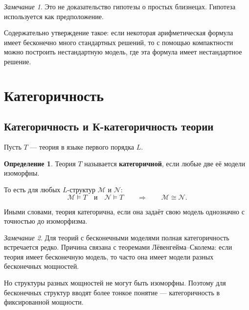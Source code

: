 \documentclass[12pt,a4paper,oneside,openany]{book}
\theoremstyle{definition}
\newtheorem{definition}{Определение}[chapter]
\theoremstyle{plain}
\theoremstyle{remark}
\newtheorem{remark}{Замечание}[chapter]
\begin{document}
\begin{remark}
Это не доказательство гипотезы о простых близнецах. Гипотеза используется как предположение.

Содержательно утверждение такое: если некоторая арифметическая формула имеет бесконечно много стандартных решений, то с помощью компактности можно построить нестандартную модель, где эта формула имеет нестандартное решение.
\end{remark}



















\section{Категоричность}

\subsection{Категоричность и К-категоричность теории}

Пусть $T$ — теория в языке первого порядка $L$.

\begin{definition}
Теория $T$ называется \textbf{категоричной}, если любые две её модели изоморфны.

То есть для любых $L$-структур $\mathcal M$ и $\mathcal N$:
\[
\mathcal M\models T
\quad
\text{и}
\quad
\mathcal N\models T
\qquad
\Longrightarrow
\qquad
\mathcal M\cong\mathcal N.
\]
\end{definition}

Иными словами, теория категорична, если она задаёт свою модель однозначно с точностью до изоморфизма.

\begin{remark}
Для теорий с бесконечными моделями полная категоричность встречается редко. Причина связана с теоремами Лёвенгейма--Сколема: если теория имеет бесконечную модель, то часто она имеет модели разных бесконечных мощностей.

Но структуры разных мощностей не могут быть изоморфны. Поэтому для бесконечных структур вводят более тонкое понятие — категоричность в фиксированной мощности.
\end{remark}
\end{document}
